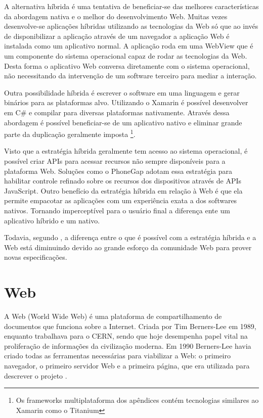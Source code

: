 A alternativa híbrida é uma tentativa de beneficiar-se das melhores
características da abordagem nativa e o melhor do desenvolvimento
Web. Muitas vezes desenvolve-se aplicações híbridas utilizando as
tecnologias da Web só que ao invés de disponibilizar a aplicação
através de um navegador a aplicação Web é instalada como um
aplicativo normal. A aplicação roda em uma WebView que é um
componente do sistema operacional capaz de rodar as tecnologias da
Web. Desta forma o aplicativo Web conversa diretamente com o sistema
operacional, não necessitando da intervenção de um software terceiro
para mediar a interação.

Outra possibilidade híbrida é escrever o software em uma linguagem
e gerar binários para as plataformas alvo. Utilizando o Xamarin é
possível desenvolver em C\# e compilar para diversas plataformas
nativamente. Através dessa abordagem é possível beneficiar-se de um
aplicativo nativo e eliminar grande parte da duplicação geralmente
imposta \footnote{Os frameworks multiplataforma dos apêndices contém
tecnologias similares ao Xamarin como o Titanium}.

Visto que a estratégia híbrida geralmente tem acesso ao sistema
operacional, é possível criar APIs para acessar recursos não sempre
disponíveis para a plataforma Web. Soluções como o PhoneGap
adotam essa estratégia para habilitar controle refinado sobre os
recursos dos dispositivos através de APIs JavaScript.
Outro benefício da estratégia híbrida em relação à Web é que
ela permite empacotar as aplicações com um experiência exata a
dos softwares nativos. Tornando imperceptível para o usuário final a
diferença ente um aplicativo híbrido e um nativo.

Todavia, segundo \citet[p. 8]{aSeriousContender}, a diferença entre o
que é possível com a estratégia híbrida e a Web está diminuindo
devido ao grande esforço da comunidade Web para prover novas
especificações.

\section{Web}

A Web (World Wide Web) é uma plataforma de compartilhamento de
documentos que funciona sobre a Internet. Criada por Tim Berners-Lee
em 1989, enquanto trabalhava para o CERN, sendo que hoje desempenha papel
vital na proliferação de informações da civilização moderna.
Em 1990 Berners-Lee havia criado todas as ferramentas necessárias
para viabilizar a Web: o primeiro navegador, o primeiro servidor
Web e a primeira página, que era utilizada para descrever o projeto
\autocite{www}.


